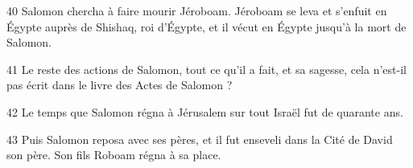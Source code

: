 
40 Salomon chercha à faire mourir Jéroboam. Jéroboam se leva et s’enfuit en Égypte auprès de Shishaq, roi d’Égypte, et il vécut en Égypte jusqu’à la mort de Salomon.

41 Le reste des actions de Salomon, tout ce qu’il a fait, et sa sagesse, cela n’est-il pas écrit dans le livre des Actes de Salomon ?

42 Le temps que Salomon régna à Jérusalem sur tout Israël fut de quarante ans.

43 Puis Salomon reposa avec ses pères, et il fut enseveli dans la Cité de David son père. Son fils Roboam régna à sa place.